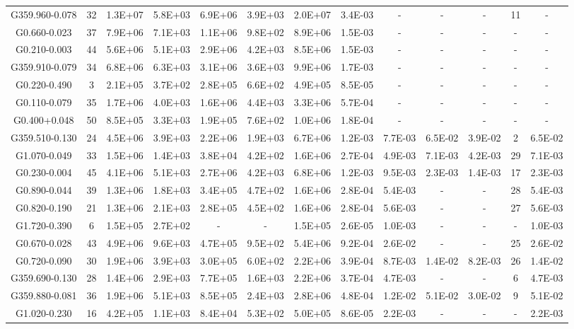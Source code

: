 \begin{table*}
\begin{tabular}{ccccccccccccc}
G359.960-0.078 & 32 & 1.3E+07 & 5.8E+03 & 6.9E+06 & 3.9E+03 & 2.0E+07 & 3.4E-03 & - & - & - & 11 & - \\
G0.660-0.023 & 37 & 7.9E+06 & 7.1E+03 & 1.1E+06 & 9.8E+02 & 8.9E+06 & 1.5E-03 & - & - & - & - & - \\
G0.210-0.003 & 44 & 5.6E+06 & 5.1E+03 & 2.9E+06 & 4.2E+03 & 8.5E+06 & 1.5E-03 & - & - & - & - & - \\
G359.910-0.079 & 34 & 6.8E+06 & 6.3E+03 & 3.1E+06 & 3.6E+03 & 9.9E+06 & 1.7E-03 & - & - & - & - & - \\
G0.220-0.490 & 3 & 2.1E+05 & 3.7E+02 & 2.8E+05 & 6.6E+02 & 4.9E+05 & 8.5E-05 & - & - & - & - & - \\
G0.110-0.079 & 35 & 1.7E+06 & 4.0E+03 & 1.6E+06 & 4.4E+03 & 3.3E+06 & 5.7E-04 & - & - & - & - & - \\
G0.400+0.048 & 50 & 8.5E+05 & 3.3E+03 & 1.9E+05 & 7.6E+02 & 1.0E+06 & 1.8E-04 & - & - & - & - & - \\ 
G359.510-0.130 & 24 & 4.5E+06 & 3.9E+03 & 2.2E+06 & 1.9E+03 & 6.7E+06 & 1.2E-03 & 7.7E-03 & 6.5E-02 & 3.9E-02 & 2 & 6.5E-02 \\
G1.070-0.049 & 33 & 1.5E+06 & 1.4E+03 & 3.8E+04 & 4.2E+02 & 1.6E+06 & 2.7E-04 & 4.9E-03 & 7.1E-03 & 4.2E-03 & 29 & 7.1E-03 \\
G0.230-0.004 & 45 & 4.1E+06 & 5.1E+03 & 2.7E+06 & 4.2E+03 & 6.8E+06 & 1.2E-03 & 9.5E-03 & 2.3E-03 & 1.4E-03 & 17 & 2.3E-03 \\
G0.890-0.044 & 39 & 1.3E+06 & 1.8E+03 & 3.4E+05 & 4.7E+02 & 1.6E+06 & 2.8E-04 & 5.4E-03 & - & - & 28 & 5.4E-03 \\
G0.820-0.190 & 21 & 1.3E+06 & 2.1E+03 & 2.8E+05 & 4.5E+02 & 1.6E+06 & 2.8E-04 & 5.6E-03 & - & - & 27 & 5.6E-03 \\
G1.720-0.390 & 6 & 1.5E+05 & 2.7E+02 & - & - & 1.5E+05 & 2.6E-05 & 1.0E-03 & - & - & - & 1.0E-03 \\
G0.670-0.028 & 43 & 4.9E+06 & 9.6E+03 & 4.7E+05 & 9.5E+02 & 5.4E+06 & 9.2E-04 & 2.6E-02 & - & - & 25 & 2.6E-02 \\
G0.720-0.090 & 30 & 1.9E+06 & 3.9E+03 & 3.0E+05 & 6.0E+02 & 2.2E+06 & 3.9E-04 & 8.7E-03 & 1.4E-02 & 8.2E-03 & 26 & 1.4E-02 \\
G359.690-0.130 & 28 & 1.4E+06 & 2.9E+03 & 7.7E+05 & 1.6E+03 & 2.2E+06 & 3.7E-04 & 4.7E-03 & - & - & 6 & 4.7E-03 \\
G359.880-0.081 & 36 & 1.9E+06 & 5.1E+03 & 8.5E+05 & 2.4E+03 & 2.8E+06 & 4.8E-04 & 1.2E-02 & 5.1E-02 & 3.0E-02 & 9 & 5.1E-02 \\
G1.020-0.230 & 16 & 4.2E+05 & 1.1E+03 & 8.4E+04 & 5.3E+02 & 5.0E+05 & 8.6E-05 & 2.2E-03 & - & - & - & 2.2E-03 \\

\end{tabular}
\end{table*}
